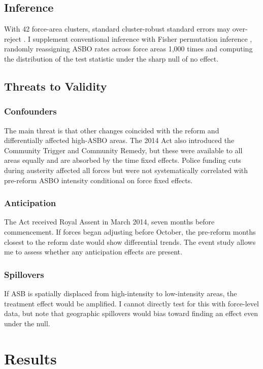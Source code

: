 \documentclass[12pt]{article}
\begin{document}
\subsection{Inference}

With 42 force-area clusters, standard cluster-robust standard errors may over-reject \citep{cameron2008}. I supplement conventional inference with Fisher permutation inference \citep{fisher1935, young2019}, randomly reassigning ASBO rates across force areas 1,000 times and computing the distribution of the test statistic under the sharp null of no effect.

\subsection{Threats to Validity}

\subsubsection*{Confounders} The main threat is that other changes coincided with the reform and differentially affected high-ASBO areas. The 2014 Act also introduced the Community Trigger and Community Remedy, but these were available to all areas equally and are absorbed by the time fixed effects. Police funding cuts during austerity affected all forces but were not systematically correlated with pre-reform ASBO intensity conditional on force fixed effects.

\subsubsection*{Anticipation} The Act received Royal Assent in March 2014, seven months before commencement. If forces began adjusting before October, the pre-reform months closest to the reform date would show differential trends. The event study allows me to assess whether any anticipation effects are present.

\subsubsection*{Spillovers} If ASB is spatially displaced from high-intensity to low-intensity areas, the treatment effect would be amplified. I cannot directly test for this with force-level data, but note that geographic spillovers would bias toward finding an effect even under the null.


\section{Results}
\end{document}
